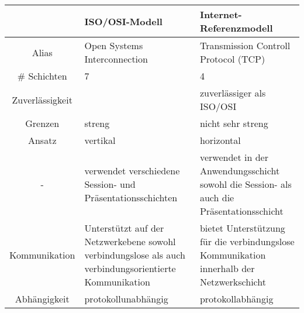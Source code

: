 \bigbreak
\begin{tabularx}{\textwidth}{|c|X|X|}
    \hline
    & ISO/OSI-Modell                                                                                         & Internet-Referenzmodell                                                                  \\
    \hline
    Alias           & Open Systems Interconnection                                                                           & Transmission Controll Protocol (TCP)                                                     \\
    \hline
    \# Schichten    & 7                                                                                                      & 4                                                                                        \\
    \hline
    Zuverlässigkeit &                                                                                                        & zuverlässiger als ISO/OSI                                                                \\
    \hline
    Grenzen         & streng                                                                                                 & nicht sehr streng                                                                        \\
    \hline
    Ansatz          & vertikal                                                                                               & horizontal                                                                               \\
    \hline
    -               & verwendet verschiedene Session- und Präsentationsschichten                                             & verwendet in der Anwendungsschicht sowohl die Session- als auch die Präsentationsschicht \\
    \hline
    Kommunikation   & Unterstützt auf der Netzwerkebene sowohl verbindungslose als auch verbindungsorientierte Kommunikation & bietet Unterstützung für die verbindungslose Kommunikation innerhalb der Netzwerkschicht                                        \\
    \hline
    Abhängigkeit    & protokollunabhängig                                                                                    & protokollabhängig                                                                        \\
    \hline
\end{tabularx}

